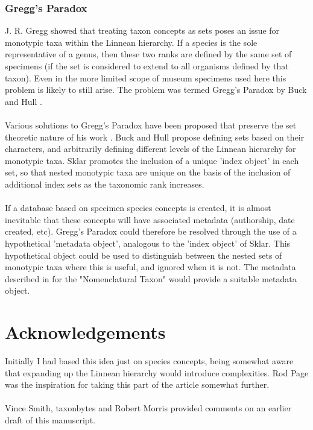 \documentclass{article}
\begin{document}
   \subsubsection{Gregg's Paradox}
   J. R. Gregg \cite{gregg1954} showed that treating taxon concepts as sets poses an issue for monotypic taxa within the Linnean hierarchy. If a species is the sole representative of a genus, then these two ranks are defined by the same set of specimens (if the set is considered to extend to all organisms defined by that taxon). Even in the more limited scope of museum specimens used here this problem is likely to still arise. The problem was termed Gregg's Paradox by Buck and Hull \cite{buckandhull1966}.
   \paragraph{}
   Various solutions to Gregg's Paradox have been proposed that preserve the set theoretic nature of his work \cite{buckandhull1966,parkerrhodes1957,sklar1964}. Buck and Hull \cite{buckandhull1966} propose defining sets based on their characters, and arbitrarily defining different levels of the Linnean hierarchy for monotypic taxa. Sklar \cite{sklar1964} promotes the inclusion of a unique 'index object' in each set, so that nested monotypic taxa are unique on the basis of the inclusion of additional index sets as the taxonomic rank increases.
   \paragraph{}
   If a database based on specimen species concepts is created, it is almost inevitable that these concepts will have associated metadata (authorship, date created, etc). Gregg's Paradox could therefore be resolved through the use of a hypothetical 'metadata object', analogous to the 'index object' of Sklar. This hypothetical object could be used to distinguish between the nested sets of monotypic taxa where this is useful, and ignored when it is not. The metadata described in \cite{pullan2000} for the "Nomenclatural Taxon" would provide a suitable metadata object.
   \section{Acknowledgements}
   Initially I had based this idea just on species concepts, being somewhat aware that expanding up the Linnean hierarchy would introduce complexities. Rod Page was the inspiration for taking this part of the article somewhat further.
   \paragraph{}
   Vince Smith, taxonbytes and Robert Morris provided comments on an earlier draft of this manuscript.
   \printbibliography{}
\end{document}
